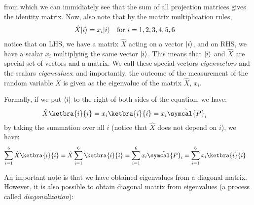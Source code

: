from which we can immidiately see that the sum of all projection matrices gives the identity matrix.
Now, also note that by the matrix multiplication rules,
\begin{align}
  \hat{X} \lvert i\rangle & = x_i \lvert i\rangle \quad \text{for } i = 1, 2, 3, 4, 5, 6
\end{align}
notice that on LHS, we have a matrix $\hat{X}$ acting on a vector $\lvert i\rangle$, and on RHS, we have a scalar $x_i$ multiplying the same vector $\lvert i\rangle$.
This means that $\lvert i\rangle$ and $\hat{X}$ are special set of vectors and a matrix.
We call these special vectors \emph{eigenvectors} and the scalars \emph{eigenvalues}:
and importantly, the outcome of the measurement of the random variable $X$ is given as the eigenvalue of the matrix $\hat{X}$, $x_i$.

Formally, if we put $\langle i\rvert$ to the right of both sides of the equation, we have:
\begin{align}
  \hat{X} \ketbra{i}{i} & = x_i \ketbra{i}{i} = x_i \hat{\symcal{P}}_i
\end{align}
by taking the summation over all $i$ (notice that $\hat{X}$ does not depend on $i$), we have:
\begin{align}
  \sum_{i=1}^{6} \hat{X} \ketbra{i}{i} = \hat{X} \sum_{i=1}^{6} \ketbra{i}{i} & = \sum_{i=1}^{6} x_i \hat{\symcal{P}}_i = \sum_{i=1}^{6} x_i \ketbra{i}{i}
\end{align}

An important note is that we have obtained eigenvalues from a diagonal matrix.
However, it is also possible to obtain diagonal matrix from eigenvalues (a process called \emph{diagonalization}):

